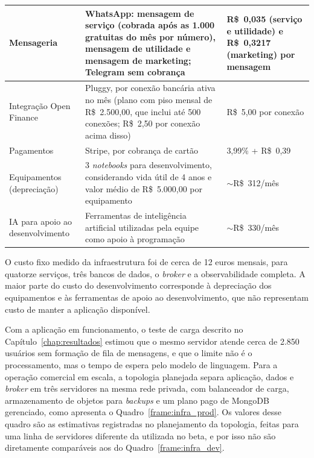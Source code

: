 {\begin{longtable}{|L{3.3cm}|L{7.2cm}|L{3.5cm}|}
Mensageria &
WhatsApp: mensagem de serviço (cobrada após as 1.000 gratuitas do mês por número), mensagem de utilidade e mensagem de marketing; Telegram sem cobrança &
R\$~0,035 (serviço e utilidade) e R\$~0,3217 (marketing) por mensagem \\ \hline

Integração Open Finance &
Pluggy, por conexão bancária ativa no mês (plano com piso mensal de R\$~2.500,00, que inclui até 500 conexões; R\$~2,50 por conexão acima disso) &
R\$~5,00 por conexão \\ \hline

Pagamentos &
Stripe, por cobrança de cartão &
3,99\% + R\$~0,39 \\ \hline

Equipamentos (depreciação) &
3 \textit{notebooks} para desenvolvimento, considerando vida útil de 4 anos e valor médio de R\$~5.000,00 por equipamento &
$\sim$R\$~312/mês \\ \hline

IA para apoio ao desenvolvimento &
Ferramentas de inteligência artificial utilizadas pela equipe como apoio à programação &
$\sim$R\$~330/mês \\ \hline

\end{longtable}
}

O custo fixo medido da infraestrutura foi de cerca de 12 euros mensais, para quatorze serviços, três bancos de dados, o \textit{broker} e a observabilidade completa. A maior parte do custo do desenvolvimento corresponde à depreciação dos equipamentos e às ferramentas de apoio ao desenvolvimento, que não representam custo de manter a aplicação disponível.

Com a aplicação em funcionamento, o teste de carga descrito no Capítulo~\ref{chap:resultados} estimou que o mesmo servidor atende cerca de 2.850 usuários sem formação de fila de mensagens, e que o limite não é o processamento, mas o tempo de espera pelo modelo de linguagem. Para a operação comercial em escala, a topologia planejada separa aplicação, dados e \textit{broker} em três servidores na mesma rede privada, com balanceador de carga, armazenamento de objetos para \textit{backups} e um plano pago de MongoDB gerenciado, como apresenta o Quadro~\ref{frame:infra_prod}. Os valores desse quadro são as estimativas registradas no planejamento da topologia, feitas para uma linha de servidores diferente da utilizada no beta, e por isso não são diretamente comparáveis aos do Quadro~\ref{frame:infra_dev}.

